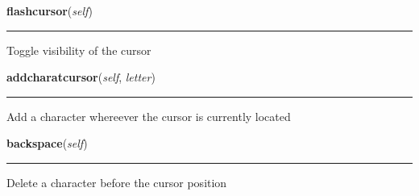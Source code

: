     \vspace{0.5ex}

\hspace{.8\funcindent}\begin{boxedminipage}{\funcwidth}

    \raggedright \textbf{flashcursor}(\textit{self})

    \vspace{-1.5ex}

    \rule{\textwidth}{0.5\fboxrule}
\setlength{\parskip}{2ex}
    Toggle visibility of the cursor

\setlength{\parskip}{1ex}
    \end{boxedminipage}

    \label{pygame-asteroids:virtual_keyboard:TextInput:addcharatcursor}

    \vspace{0.5ex}

\hspace{.8\funcindent}\begin{boxedminipage}{\funcwidth}

    \raggedright \textbf{addcharatcursor}(\textit{self}, \textit{letter})

    \vspace{-1.5ex}

    \rule{\textwidth}{0.5\fboxrule}
\setlength{\parskip}{2ex}
    Add a character whereever the cursor is currently located

\setlength{\parskip}{1ex}
    \end{boxedminipage}

    \label{pygame-asteroids:virtual_keyboard:TextInput:backspace}

    \vspace{0.5ex}

\hspace{.8\funcindent}\begin{boxedminipage}{\funcwidth}

    \raggedright \textbf{backspace}(\textit{self})

    \vspace{-1.5ex}

    \rule{\textwidth}{0.5\fboxrule}
\setlength{\parskip}{2ex}
    Delete a character before the cursor position

\setlength{\parskip}{1ex}
    \end{boxedminipage}

